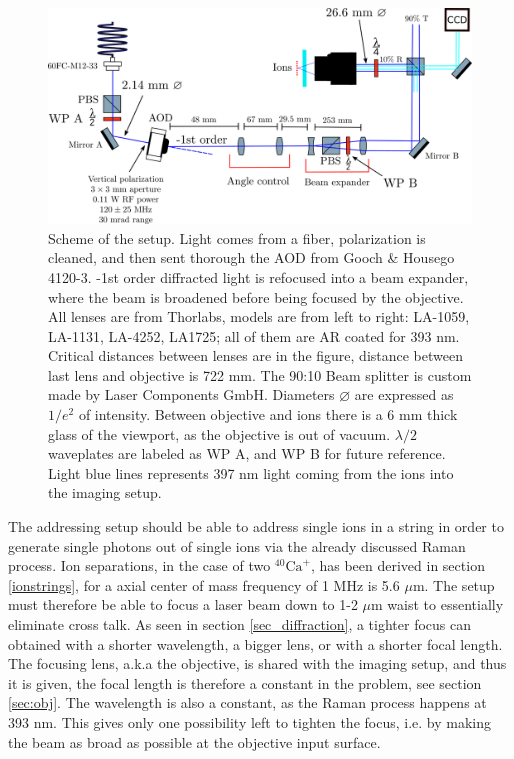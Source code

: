 \begin{figure}[H]
\centering
\includegraphics[width=\textwidth]{img/setup}
\caption{Scheme of the setup. Light comes from a fiber, polarization is cleaned, and then sent thorough the AOD from Gooch \& Housego 4120-3. -1st order diffracted light is refocused into a beam expander, where the beam is broadened before being focused by the objective. All lenses are from Thorlabs, models are from left to right: LA-1059, LA-1131, LA-4252, LA1725; all of them are AR coated for 393 nm. Critical distances between lenses are in the figure, distance between last lens and objective is 722 mm. The 90:10 Beam splitter is custom made by Laser Components GmbH. Diameters $\varnothing$ are expressed as $1/e^2$ of intensity. Between objective and ions there is a 6 mm thick glass of the viewport, as the objective is out of vacuum. $\lambda/2$ waveplates are labeled as WP A, and WP B for future reference. Light blue lines represents 397 nm light coming from the ions into the imaging setup.}
\label{addressingsetup}
\end{figure}
The addressing setup should be able to address single ions in a string in order to generate single photons out of single ions via the already discussed Raman process. Ion separations, in the case of two $^{40}\text{Ca}^+$, has been derived in section \ref{ionstrings}, for a axial center of mass frequency of 1 MHz is 5.6 $\mu$m. The setup must therefore be able to focus a laser beam down to 1-2 $\mu$m waist to essentially eliminate cross talk. As seen in section \ref{sec_diffraction}, a tighter focus can obtained with a shorter wavelength, a bigger lens, or with a shorter focal length. The focusing lens, a.k.a the objective, is shared with the imaging setup, and thus it is given, the focal length is therefore a constant in the problem, see section \ref{sec:obj}. The wavelength is also a constant, as the Raman process happens at 393 nm. This gives only one possibility left to tighten the focus, i.e. by making the beam as broad as possible at the objective input surface.\\
